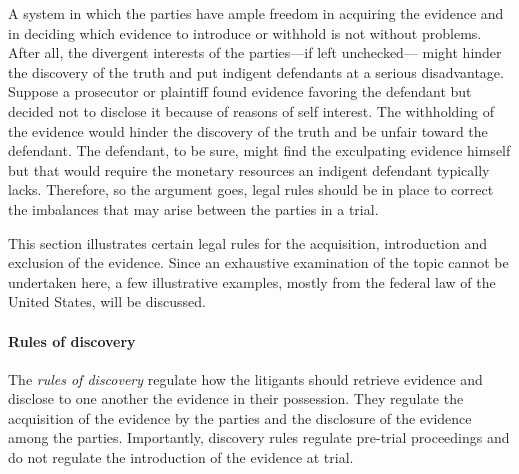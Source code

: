 \documentclass[10pt]{article}
\begin{document}
A system in which the parties have ample 
 freedom in acquiring the evidence and in deciding 
 which evidence to introduce or withhold is not without problems.  
After all, the divergent interests of the parties---if left unchecked---%
might hinder the discovery of the truth and put indigent defendants at a serious disadvantage. Suppose a prosecutor or plaintiff found evidence favoring the defendant but decided not to disclose it because of reasons of self interest. The withholding of the evidence would hinder the discovery of the truth and be unfair toward the defendant. The defendant, to be sure, might find the exculpating evidence himself but that would require the monetary resources an indigent defendant typically lacks. Therefore, so the argument goes, legal rules should be in 
place to correct the imbalances that may arise between the parties in a trial.

This section illustrates certain legal rules for the acquisition, introduction and exclusion of the evidence. Since an exhaustive examination of the topic cannot be undertaken here, a few illustrative examples, mostly from the federal law of the United States, will be discussed. 




\paragraph{Rules of discovery}
The \textit{rules of discovery} regulate how the litigants should retrieve evidence and disclose 
to one another the evidence in their possession. %
They regulate the acquisition of the evidence by the parties and the disclosure 
of the evidence among the parties. Importantly, discovery rules regulate pre-trial proceedings and do not regulate 
the introduction of the evidence at trial. %
 
\end{document}
